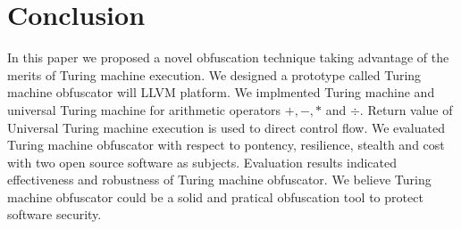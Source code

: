 \documentclass[lnicst]{svmultln}
\begin{document}
\section{Conclusion}
In this paper we proposed a novel obfuscation technique taking advantage of the
merits of Turing machine execution. We designed a prototype called Turing
machine obfuscator will LLVM platform. We implmented Turing machine and
universal Turing machine for arithmetic operators $+, -, *$ and $\div$. Return
value of Universal Turing machine execution is used to direct control flow. We
evaluated Turing machine obfuscator with respect to pontency, resilience,
stealth and cost with two open source software as subjects. Evaluation results
indicated effectiveness and robustness of Turing machine obfuscator. We believe
Turing machine obfuscator could be a solid and pratical obfuscation tool to
protect software security.
\end{document}
